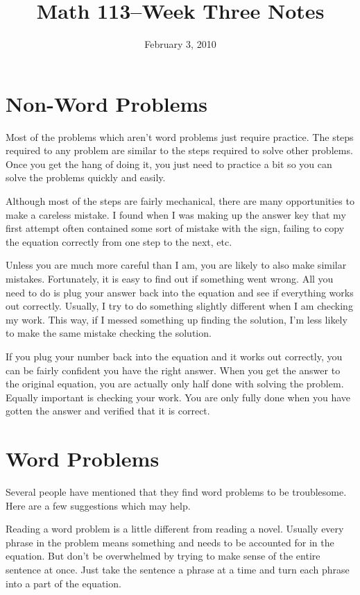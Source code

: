 \documentclass[fleqn]{article}
\title{Math 113--Week Three Notes}
\author{}
\date{February 3, 2010}
\begin{document}
\maketitle

\section{Non-Word Problems}

Most of the problems which aren't word problems just require practice.  The steps required to any problem are similar to
the steps required to solve other problems.  Once you get the hang of doing it, you just need to practice a bit
so you can solve the problems quickly and easily.

Although most of the steps are fairly mechanical, there are many opportunities to make a careless mistake.  I found when
I was making up the answer key that my first attempt often contained some sort of mistake with the sign, failing to copy
the equation correctly from one step to the next, etc.  

Unless you are much more careful than I am, you are likely to also make similar mistakes.  Fortunately, it is easy to
find out if something went wrong.  All you need to do is plug your answer back into the equation and see if everything
works out correctly.  Usually, I try to do something slightly different when I am checking my work.  This way, if I messed
something up finding the solution, I'm less likely to make the same mistake checking the solution.

If you plug your number back into the equation and it works out correctly, you can be fairly confident you have the
right answer.  When you get the answer to the original equation, you are actually only half done with solving the
problem.  Equally important is checking your work.  You are only fully done when you have gotten the answer and verified
that it is correct.

\section{Word Problems}

Several people have mentioned that they find word problems to be troublesome.  Here are a few suggestions which may help.

Reading a word problem is a little different from reading a novel.  Usually every phrase in the problem means
something and needs to be accounted for in the equation.  But don't be overwhelmed by trying to make sense of the entire
sentence at once.  Just take the sentence a phrase at a time and turn each phrase into a part of the equation.
\end{document}
